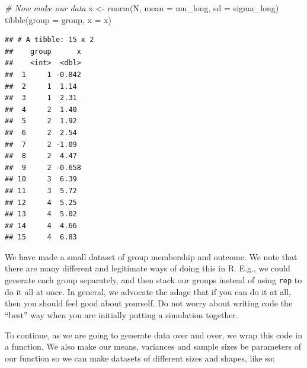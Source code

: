\documentclass[
]{book}
\newenvironment{Shaded}{\begin{snugshade}}{\end{snugshade}}
\newcommand{\AttributeTok}[1]{\textcolor[rgb]{0.77,0.63,0.00}{#1}}
\newcommand{\CommentTok}[1]{\textcolor[rgb]{0.56,0.35,0.01}{\textit{#1}}}
\newcommand{\FunctionTok}[1]{\textcolor[rgb]{0.00,0.00,0.00}{#1}}
\newcommand{\NormalTok}[1]{#1}
\newcommand{\OtherTok}[1]{\textcolor[rgb]{0.56,0.35,0.01}{#1}}
\begin{document}
\begin{Shaded}
\begin{Highlighting}[]
\CommentTok{\# Now make our data}
\NormalTok{x }\OtherTok{\textless{}{-}} \FunctionTok{rnorm}\NormalTok{(N, }\AttributeTok{mean =}\NormalTok{ mu\_long, }\AttributeTok{sd =}\NormalTok{ sigma\_long)}
\FunctionTok{tibble}\NormalTok{(}\AttributeTok{group =}\NormalTok{ group, }\AttributeTok{x =}\NormalTok{ x)}
\end{Highlighting}
\end{Shaded}

\begin{verbatim}
## # A tibble: 15 x 2
##    group      x
##    <int>  <dbl>
##  1     1 -0.842
##  2     1  1.14 
##  3     1  2.31 
##  4     2  1.40 
##  5     2  1.92 
##  6     2  2.54 
##  7     2 -1.09 
##  8     2  4.47 
##  9     2 -0.658
## 10     3  6.39 
## 11     3  5.72 
## 12     4  5.25 
## 13     4  5.02 
## 14     4  4.66 
## 15     4  6.83
\end{verbatim}

We have made a small dataset of group membership and outcome.
We note that there are many different and legitimate ways of doing this in R.
E.g., we could generate each group separately, and then stack our groups instead of using \texttt{rep} to do it all at once.
In general, we advocate the adage that if you can do it at all, then you should feel good about yourself.
Do not worry about writing code the ``best'' way when you are initially putting a simulation together.

To continue, as we are going to generate data over and over, we wrap this code in a function.
We also make our means, variances and sample sizes be parameters of our function so we can make datasets of different sizes and shapes, like so:
\end{document}
